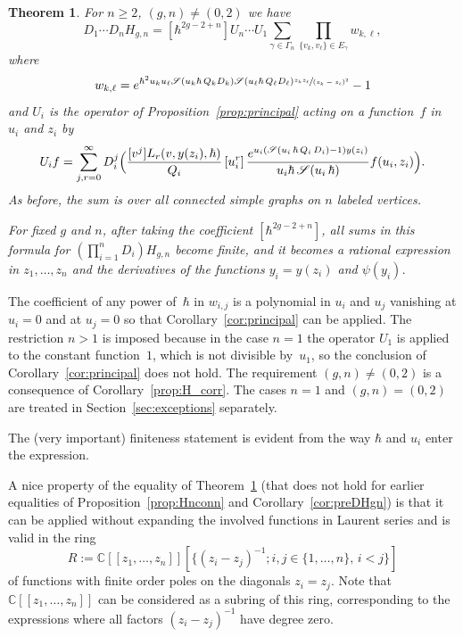 \documentclass[11pt]{article}
\let\mathcal\mathscr
\newcommand{\llbracket}{[\![}
\newcommand{\rrbracket}{]\!]}
\theoremstyle{plain}
\newtheorem{theorem}{Theorem}[section]
\theoremstyle{definition}
\theoremstyle{remark}
\newcommand{\cS}{\mathcal{S}}
\newcommand{\Hc}{H}
\begin{document}
\begin{theorem}\label{prop:mainprop} For $n\geq 2$, $(g,n)\neq(0,2)$ we have
\begin{equation}\label{eq:mainprop}
D_1\cdots D_nH_{g,n}=[\hbar^{2g-2+n}]
U_n\cdots U_1
\sum_{\gamma \in \Gamma_n}\prod_{\{v_k,v_\ell\}\in E_\gamma} w_{k,\ell},
\end{equation}
where
\begin{equation}\label{eq:wkl}
w_{k,\ell}=e^{\hbar^2u_ku_\ell\cS(u_k\hbar\,Q_k D_k)\cS(u_\ell\hbar\,Q_\ell D_\ell)
\sfrac{z_k z_\ell}{(z_k-z_\ell)^2}}-1
\end{equation}
and $U_{i}$ is the operator of Proposition~\ref{prop:principal} acting on a function~$f$ in~$u_i$ and $z_i$ by
\begin{equation*}\label{Uioperator}
U_{i} f=\sum_{j,r=0}^\infty D_i^j\Bigl(\frac{[v^j]L_r(v,y(z_i),\hbar)}{Q_i}
\,[u_i^r]\, \frac{e^{u_i(\cS(u_i\,\hbar\,Q_i\,D_i)-1)y(z_i)}}{u_i\hbar\,\cS(u_i\,\hbar)}f(u_i,z_i) \Bigr).
\end{equation*}
As before, the sum is over all connected simple graphs
on $n$ labeled vertices.

For fixed $g$ and $n$, after taking the coefficient $[\hbar^{2g-2+n}]$, all sums in this formula for $\left(\prod_{i=1}^n D_i\right) \Hc_{g,n}$ become finite, and it becomes a rational expression in $z_1,\ldots,z_n$ and the derivatives of the functions $y_i=y(z_i)$ and $\psi(y_i)$.
\end{theorem}

The coefficient of any power of~$\hbar$ in $w_{i,j}$ is a polynomial in $u_i$ and $u_j$ vanishing at $u_i=0$ and at $u_j=0$ so that Corollary~\ref{cor:principal} can be applied.
The restriction $n>1$ is imposed because in the case $n=1$ the operator $U_1$ is applied to the constant function~$1$, which is not divisible by~$u_1$, so the conclusion of Corollary~\ref{cor:principal} does not hold. The requirement $(g,n)\ne(0,2)$ is a consequence of Corollary~\ref{prop:H_corr}. The cases $n=1$ and $(g,n)=(0,2)$ are treated in Section~\ref{sec:exceptions} separately.

The (very important) finiteness statement is evident from the way $\hbar$ and $u_i$ enter the expression.

A nice property of the equality of Theorem~\ref{prop:mainprop} (that does not hold for earlier equalities of Proposition~\ref{prop:Hnconn} and Corollary~\ref{cor:preDHgn})
is that it can be applied without expanding the involved functions in Laurent series and is valid in the ring
\[
R:=\mathbb{C}\llbracket z_1,\dots,z_n\rrbracket [\{(z_i-z_j)^{-1};i,j\in\{1,\ldots,n\},\,i<j\}]
\]
of functions with finite order poles on the diagonals $z_i=z_j$. Note that $\mathbb{C}\llbracket z_1,\dots,z_n\rrbracket $ can be considered as a subring of this ring, corresponding to the expressions where all factors $(z_i-z_j)^{-1}$ have degree zero.
\end{document}
